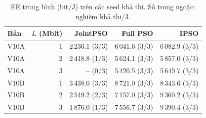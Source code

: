 \begin{table}
\centering
\renewcommand{\arraystretch}{1.16}
\setlength{\tabcolsep}{5pt}
\begin{tabular}{lrrrr}
\toprule
Bản & $L$ (Mbit) & JointPSO & Full PSO & IPSO \\
\midrule
V10A & 1 & 2\,236.1 (3/3) & 6\,041.6 (3/3) & 6\,082.9 (3/3) \\
V10A & 2 & 2\,418.8 (1/3) & 5\,624.1 (3/3) & 5\,857.0 (3/3) \\
V10A & 3 & -- (0/3) & 5\,420.5 (3/3) & 5\,649.7 (3/3) \\
V10B & 1 & 3\,438.0 (3/3) & 8\,721.0 (3/3) & 8\,343.6 (3/3) \\
V10B & 2 & 2\,549.2 (2/3) & 7\,157.0 (3/3) & 9\,360.2 (3/3) \\
V10B & 3 & 1\,876.0 (1/3) & 7\,556.7 (3/3) & 9\,390.4 (3/3) \\
\bottomrule
\end{tabular}
\caption{EE trung bình (bit/J) trên các seed khả thi. Số trong ngoặc: nghiệm khả thi/3.}
\end{table}
